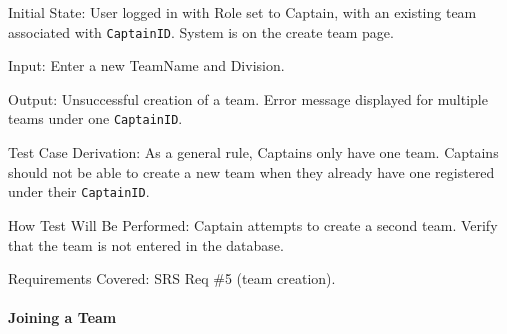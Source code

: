 \documentclass[12pt, titlepage]{article}
\begin{document}
\begin{enumerate}
        Initial State: User logged in with Role set to Captain, with an existing team associated with \texttt{CaptainID}. System is on the create team page.

        Input: Enter a new TeamName and Division.

        Output: Unsuccessful creation of a team. Error message displayed for multiple teams under one \texttt{CaptainID}.

        Test Case Derivation: As a general rule, Captains only have one team. Captains should not be able to create a new team when they already have one registered under their \texttt{CaptainID}.

        How Test Will Be Performed: Captain attempts to create a second team. Verify that the team is not entered in the database.

        Requirements Covered: SRS Req \#5 (team creation).
\end{enumerate}

\paragraph{Joining a Team}
\end{document}
